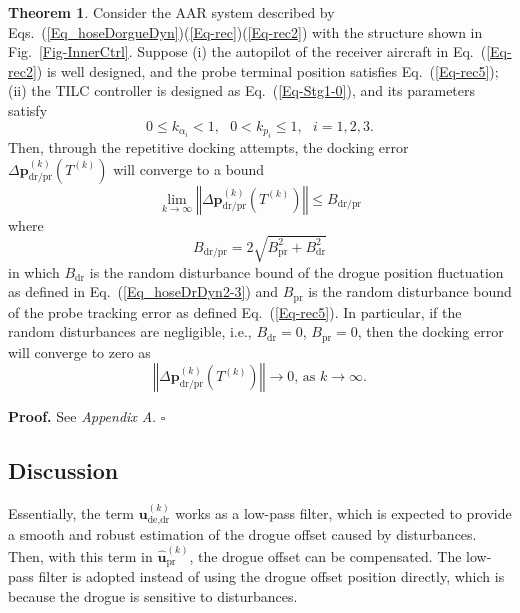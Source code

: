 \textbf{Theorem 1}. Consider the AAR system described by Eqs.~(\ref{Eq_hoseDorgueDyn})(\ref{Eq-rec})(\ref{Eq-rec2})
with the structure shown in Fig.~\ref{Fig-InnerCtrl}. Suppose (i)
the autopilot of the receiver aircraft in Eq.~(\ref{Eq-rec2}) is
well designed, and the probe terminal position satisfies Eq.~(\ref{Eq-rec5});
(ii) the TILC controller is designed as Eq.~(\ref{Eq-Stg1-0}), and
its parameters satisfy
\begin{equation}
0\leq k_{\alpha_{i}}<1,\text{ }0<k_{p_{i}}\leq1,\text{ }i=1,2,3.\label{Eq-Stg2-5}
\end{equation}
Then, through the repetitive docking attempts, the docking error $\Delta{\mathbf{p}}_{\text{dr/pr}}^{\left(k\right)}\left(T^{\left(k\right)}\right)$
will converge to a bound
\begin{equation}
\lim_{k\rightarrow\infty}\left\Vert \Delta{\mathbf{p}}_{\text{dr/pr}}^{\left(k\right)}\left(T^{\left(k\right)}\right)\right\Vert \leq B_{\text{dr/pr}}\label{Eq-Stg2-6}
\end{equation}
where
\begin{equation}
B_{\text{dr/pr}}=2\sqrt{B_{\text{pr}}^{2}+B_{\text{dr}}^{2}}\label{Eq-Stg2-7}
\end{equation}
in which $B_{\text{dr}}$ is the random disturbance bound of the drogue
position fluctuation as defined in Eq.~(\ref{Eq_hoseDrDyn2-3}) and
$B_{\text{pr}}$ is the random disturbance bound of the probe tracking
error as defined Eq.~(\ref{Eq-rec5}). In particular, if the random
disturbances are negligible, i.e., $B_{\text{dr}}=0$, $B_{\text{pr}}=0$,
then the docking error will converge to zero as
\begin{equation}
\left\Vert \Delta{\mathbf{p}}_{\text{dr/pr}}^{\left(k\right)}\left(T^{\left(k\right)}\right)\right\Vert \rightarrow0\text{, as }k\rightarrow\infty.\label{Eq-Stg2-8}
\end{equation}

\textbf{Proof.} See \textit{Appendix A}. $\square$

\subsection{Discussion}

Essentially, the term $\mathbf{u}_{\text{de,dr}}^{\left(k\right)}$
works as a low-pass filter, which is expected to provide a smooth
and robust estimation of the drogue offset caused by disturbances.
Then, with this term in $\mathbf{\hat{u}}_{\text{pr}}^{\left(k\right)}$,
the drogue offset can be compensated. The low-pass filter is adopted
instead of using the drogue offset position directly, which is because
the drogue is sensitive to disturbances.

